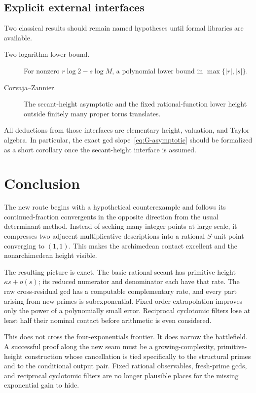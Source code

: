 \documentclass[11pt,oneside]{article}
\theoremstyle{definition}
\theoremstyle{remark}
\begin{document}
\subsection{Explicit external interfaces}

Two classical results should remain named hypotheses until formal libraries are available.

\begin{description}
\item[Two-logarithm lower bound.]  For nonzero
$r\log2-s\log M$, a polynomial lower bound in $\max\{|r|,|s|\}$.
\item[Corvaja--Zannier.]  The secant-height asymptotic and the fixed rational-function lower
height outside finitely many proper torus translates.
\end{description}

All deductions from those interfaces are elementary height, valuation, and Taylor algebra.
In particular, the exact gcd slope~\eqref{eq:G-asymptotic} should be formalized as a short
corollary once the secant-height interface is assumed.

\section{Conclusion}
\label{sec:conclusion}

The new route begins with a hypothetical counterexample and follows its continued-fraction
convergents in the opposite direction from the usual determinant method.  Instead of seeking
many integer points at large scale, it compresses two adjacent multiplicative descriptions
into a rational $S$-unit point converging to $(1,1)$.  This makes the archimedean contact
excellent and the nonarchimedean height visible.

The resulting picture is exact.  The basic rational secant has primitive height
$\kappa s+o(s)$; its reduced numerator and denominator each have that rate.  The raw
cross-residual gcd has a computable complementary rate, and every part arising from new
primes is subexponential.  Fixed-order extrapolation improves only the power of a
polynomially small error.  Reciprocal cyclotomic filters lose at least half their nominal
contact before arithmetic is even considered.

This does not cross the four-exponentials frontier.  It does narrow the battlefield.  A
successful proof along the new seam must be a growing-complexity, primitive-height
construction whose cancellation is tied specifically to the structural primes and to the
conditional output pair.  Fixed rational observables, fresh-prime gcds, and reciprocal
cyclotomic filters are no longer plausible places for the missing exponential gain to hide.
\end{document}

